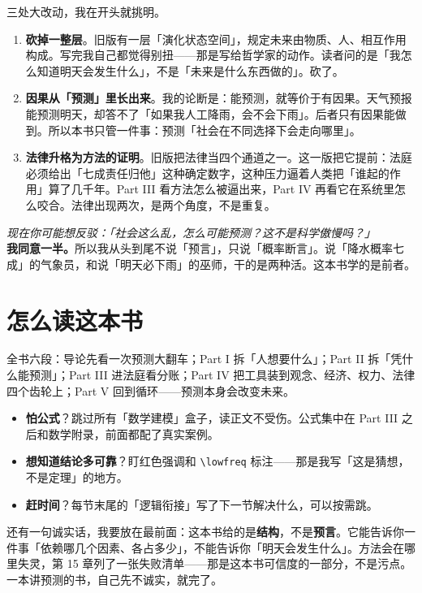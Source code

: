 \documentclass[../main2.tex]{subfiles}
\begin{document}
三处大改动，我在开头就挑明。

\begin{enumerate}
	\item \textbf{砍掉一整层}。旧版有一层「演化状态空间」，规定未来由物质、人、相互作用构成。写完我自己都觉得别扭——那是写给哲学家的动作。读者问的是「我怎么知道明天会发生什么」，不是「未来是什么东西做的」。砍了。
	\item \textbf{因果从「预测」里长出来}。我的论断是：能预测，就等价于有因果。天气预报能预测明天，却答不了「如果我人工降雨，会不会下雨」。后者只有因果能做到。所以本书只管一件事：预测「社会在不同选择下会走向哪里」。
	\item \textbf{法律升格为方法的证明}。旧版把法律当四个通道之一。这一版把它提前：法庭必须给出「七成责任归他」这种确定数字，这种压力逼着人类把「谁起的作用」算了几千年。Part III 看方法怎么被逼出来，Part IV 再看它在系统里怎么咬合。法律出现两次，是两个角度，不是重复。
\end{enumerate}

\begin{questionbox}
	\textit{现在你可能想反驳：「社会这么乱，怎么可能预测？这不是科学傲慢吗？」}\\
	\textbf{我同意一半。}所以我从头到尾不说「预言」，只说「概率断言」。说「降水概率七成」的气象员，和说「明天必下雨」的巫师，干的是两种活。这本书学的是前者。
\end{questionbox}

\section{怎么读这本书}

全书六段：导论先看一次预测大翻车；Part I 拆「人想要什么」；Part II 拆「凭什么能预测」；Part III 进法庭看分账；Part IV 把工具装到观念、经济、权力、法律四个齿轮上；Part V 回到循环——预测本身会改变未来。

\begin{itemize}
	\item \textbf{怕公式}？跳过所有「数学建模」盒子，读正文不受伤。公式集中在 Part III 之后和数学附录，前面都配了真实案例。
	\item \textbf{想知道结论多可靠}？盯红色强调和 \texttt{\textbackslash lowfreq} 标注——那是我写「这是猜想，不是定理」的地方。
	\item \textbf{赶时间}？每节末尾的「逻辑衔接」写了下一节解决什么，可以按需跳。
\end{itemize}

还有一句诚实话，我要放在最前面：这本书给的是\textbf{结构}，不是\textbf{预言}。它能告诉你一件事「依赖哪几个因素、各占多少」，不能告诉你「明天会发生什么」。方法会在哪里失灵，第 15 章列了一张失败清单——那是这本书可信度的一部分，不是污点。一本讲预测的书，自己先不诚实，就完了。
\end{document}
